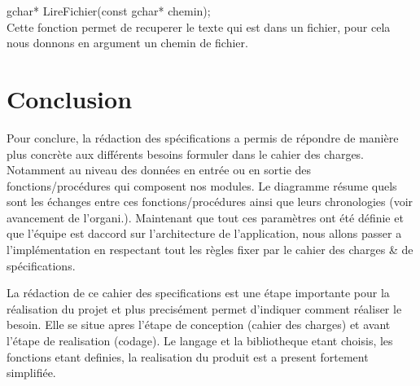 \documentclass[a4]{article}
\begin{document}
	gchar* LireFichier(const gchar* chemin);\\
		Cette fonction permet de recuperer le texte qui est dans un fichier, pour cela nous donnons en argument un chemin de fichier.\\
	
	\section{Conclusion}
	
	Pour conclure, la rédaction des spécifications a permis de répondre de manière plus concrète aux différents besoins formuler 	         dans le cahier des charges. Notamment au niveau des données en entrée ou en sortie des fonctions/procédures qui composent nos
	modules. Le diagramme résume quels sont les échanges entre ces fonctions/procédures ainsi que leurs chronologies (voir
	avancement de l'organi.).
	Maintenant que tout ces paramètres ont été définie et que l'équipe est daccord sur l'architecture de l'application, nous allons
	passer a l'implémentation en respectant tout les règles fixer par le cahier des charges & de spécifications.
	
	La rédaction de ce cahier des specifications est une étape importante pour la réalisation du projet
	et plus precisément permet d'indiquer comment réaliser le besoin.
	Elle se situe apres l'étape de conception
	(cahier des charges) et avant l'étape de realisation (codage). Le langage et la bibliotheque etant choisis,
	les fonctions etant definies, la realisation du produit est a present fortement simplifiée. 
	
	
\end{document}
